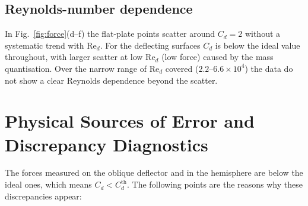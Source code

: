 \documentclass[11pt,a4paper]{article}
\numberwithin{equation}{section}
\newcommand{\Cd}{C_d}
\newcommand{\Red}{\mathrm{Re}_d}
\begin{document}
\subsection{Reynolds-number dependence}
 
In Fig.~\ref{fig:force}(d--f) the flat-plate points scatter around $\Cd=2$ without a systematic trend with $\Red$. For the deflecting surfaces $\Cd$ is below the ideal value throughout, with larger scatter at low $\Red$ (low force) caused by the mass quantisation. Over the narrow range of $\Red$ covered ($2.2$--$6.6\times10^{4}$) the data do not show a clear Reynolds dependence beyond the scatter.

\section{Physical Sources of Error and Discrepancy Diagnostics}

The forces measured on the oblique deflector and in the hemisphere are below the ideal ones, which means $\Cd<\Cd^{\mathrm{th}}$. The following points are the reasons why these discrepancies appear:
\end{document}
